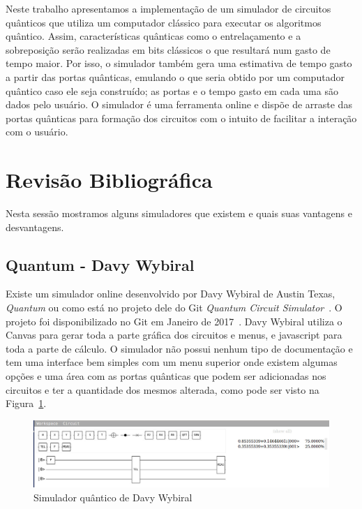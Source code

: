 \documentclass[a4paper, 12pt, oneside]{book}
\begin{document}
Neste trabalho apresentamos a implementação de um simulador de circuitos quânticos que utiliza um computador clássico para executar os algoritmos quântico. Assim, características quânticas como o entrelaçamento e a sobreposição serão realizadas em bits clássicos o que resultará num gasto de tempo maior. Por isso, o simulador também gera uma estimativa de tempo gasto a partir das portas quânticas, emulando o que seria obtido por um computador quântico caso ele seja construído; as portas e o tempo gasto em cada uma são dados pelo usuário. O simulador é uma ferramenta online e dispõe de arraste das portas quânticas para formação dos circuitos com o intuito de facilitar a interação com o usuário.

\section{Revisão Bibliográfica}

Nesta sessão mostramos alguns simuladores que existem e quais suas vantagens e desvantagens.

\subsection{Quantum - Davy Wybiral}

Existe um simulador online desenvolvido por Davy Wybiral de Austin Texas, \textit{Quantum} ou como está no projeto dele do Git \textit{Quantum Circuit Simulator}~\cite{davyw}. O projeto foi disponibilizado no Git em Janeiro de 2017~\cite{gitdavyw}. Davy Wybiral utiliza o Canvas para gerar toda a parte gráfica dos circuitos e menus, e javascript para toda a parte de cálculo. O simulador não possui nenhum tipo de documentação e tem uma interface bem simples com um menu superior onde existem algumas opções e uma área com as portas quânticas que podem ser adicionadas nos circuitos e ter a quantidade dos mesmos alterada, como pode ser visto na Figura~\ref{fig:davyw}.

\begin{figure}[H]
\centering
\includegraphics[scale=0.36]{davyw.jpg}
\caption{Simulador quântico de Davy Wybiral}
\label{fig:davyw}
\end{figure}
\end{document}
